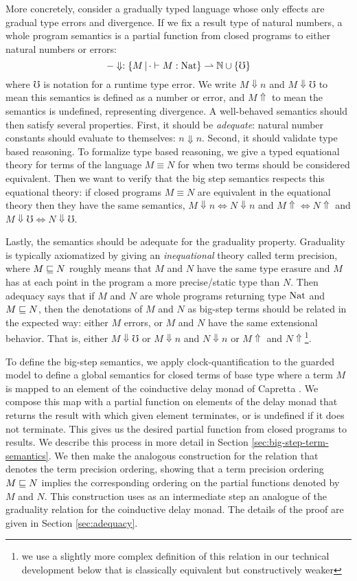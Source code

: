 More concretely, consider a gradually typed language whose only effects are
gradual type errors and divergence. If we fix a result type of natural numbers,
a whole program semantics is a partial function from closed programs to either
natural numbers or errors:
%
\[ -\Downarrow : \{M \,|\, \cdot \vdash M : \text{Nat} \} \rightharpoonup \mathbb{N}
\cup \{\mho\} \] 
%
where $\mho$ is notation for a runtime type error. We write $M \Downarrow n$ and
$M\Downarrow \mho$ to mean this semantics is defined as a number or error, and
$M\Uparrow$ to mean the semantics is undefined, representing divergence.
%
A well-behaved semantics should then satisfy several properties. First, it
should be \emph{adequate}: natural number constants should evaluate to
themselves: $n \Downarrow n$. Second, it should validate type based reasoning.
To formalize type based reasoning, we give a typed equational theory for terms
of the language $M \equiv N$ for when two terms should be considered equivalent.
Then we want to verify that the big step semantics respects this equational
theory: if closed programs $M \equiv N$ are equivalent in the equational theory
then they have the same semantics, $M \Downarrow n \iff N \Downarrow n$ and
$M\Uparrow \iff N \Uparrow$ and $M \Downarrow \mho \iff N \Downarrow \mho$.

Lastly, the semantics should be adequate for the graduality property. Graduality
is typically axiomatized by giving an \emph{inequational} theory called term
precision, where $M \sqsubseteq N$ roughly means that $M$ and $N$ have the same type
erasure and $M$ has at each point in the program a more precise/static type than
$N$. Then adequacy says that if $M$ and $N$ are whole programs returning type
$\text{Nat}$ and $M \sqsubseteq N$, then the denotations of $M$ and $N$ as big-step terms
should be related in the expected way: either $M$ errors, or $M$ and $N$ have
the same extensional behavior. That is, either $M\Downarrow \mho$ or $M
\Downarrow n $ and $N \Downarrow n$ or $M \Uparrow $ and $N
\Uparrow$\footnote{we use a slightly more complex definition of this relation in
our technical development below that is classically equivalent but
constructively weaker}.

To define the big-step semantics, we apply clock-quantification to the guarded
model to define a global semantics for closed terms of base type where a term
$M$ is mapped to an element of the coinductive delay monad of Capretta
\cite{lmcs:2265}. We compose this map with a partial function on elements of the
delay monad that returns the result with which given element terminates, or is
undefined if it does not terminate. This gives us the desired partial function
from closed programs to results. We describe this process in more detail in Section
\ref{sec:big-step-term-semantics}.
%
We then make the analogous construction for the relation that denotes the term
precision ordering, showing that a term precision ordering $M \sqsubseteq N$ implies
the corresponding ordering on the partial functions denoted by $M$ and $N$. This
construction uses as an intermediate step an analogue of the graduality relation
for the coinductive delay monad. The details of the proof are given in Section
\ref{sec:adequacy}.


